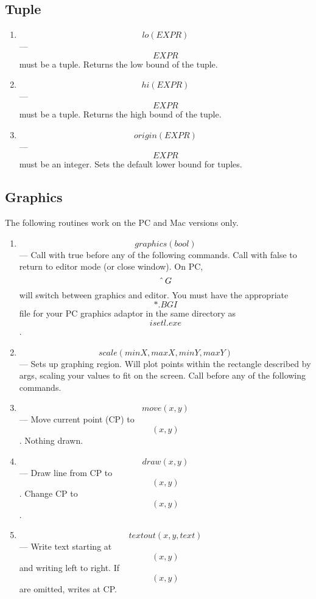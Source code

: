 {\subsection{Tuple}
\label{tuple-func}
\begin{enumerate}
\item
\[lo(EXPR)\] ---
\[EXPR\] must be a tuple.
Returns the low bound of the tuple.

\item
\[hi(EXPR)\] ---
\[EXPR\] must be a tuple.
Returns the high bound of the tuple.

\item
\[origin(EXPR)\] ---
\[EXPR\] must be an integer.
Sets the default lower bound for tuples.


\end{enumerate}


\subsection{Graphics}

The following routines work on the PC and Mac versions only.

\begin{enumerate}
\item \[graphics(bool)\] ---
  Call with true before any of the following commands.
		Call with false to return to editor mode (or close
		window).  On PC, \[\mbox{\^\,} G\] will switch between graphics and
		editor.   You must have the appropriate \[*.BGI\] file for
		your PC graphics adaptor in the same directory as
		\[isetl.exe\]. 


\item \[scale(minX,maxX,minY,maxY)\] ---
		Sets up graphing region.  Will plot points within the 
		rectangle described by args, scaling your values to fit
		on the screen.  Call before any of the following commands.

\item \[move(x,y)\] ---
       Move current point (CP) to \[(x,y)\].  Nothing drawn.

\item \[draw(x,y)\] ---
       Draw line from CP to \[(x,y)\].  Change CP to \[(x,y)\].

\item \[textout(x,y,text)\] ---
                Write text starting at \[(x,y)\] and writing left to
                right.  If \[(x,y)\] are omitted, writes at CP.


\end{enumerate}}
